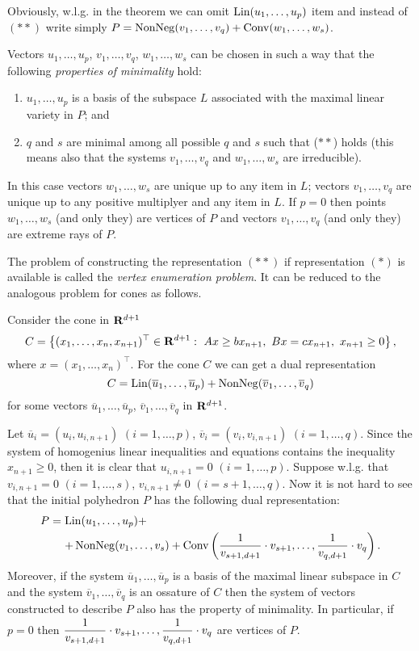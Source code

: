 \documentclass{article}
\newcommand{\RR}{{\rm\bf R}}
\newcommand{\Lin}{\mathop{\rm Lin}\nolimits}
\newcommand{\NonNeg}{\mathop{\rm NonNeg}\nolimits}
\newcommand{\Conv}{\mathop{\rm Conv}\nolimits}
\newcommand{\set}[1]{\left\{ #1\right\}}
\newcommand{\transpose}{^{\top}}
\newcommand{\fracc}[2]{\frac{\textstyle #1\strut}{\textstyle #2\strut}}
\newenvironment{narrowarray}[1]{\arraycolsep=0.15em\begin{array}{#1}}{\end{array}}
\begin{document}
Obviously, w.l.g. in the theorem 
we can omit $\Lin(u_1,\dots,u_p)$ item and instead of $(**)$ 
write simply $P=\NonNeg(v_1,\dots,v_q)+ \Conv(w_1,\dots,w_s)$.


Vectors $u_1,\dots,u_p$, $v_1,\dots,v_q$, $w_1,\dots,w_s$ 
can be chosen in such a way that 
the following {\em properties of minimality} hold:
\begin{enumerate}
  \item $u_1,\dots,u_p$ is a basis of the subspace $L$ associated with
        the maximal linear variety in $P$; and
  \item $q$ and $s$ are minimal among all possible $q$ and $s$ such that ($**$)
        holds (this means also that the systems $v_1,\dots,v_q$ and
        $w_1,\dots,w_s$ are irreducible).
\end{enumerate}
In this case 
vectors $w_1,\dots,w_s$ are unique up to any item in $L$;
vectors $v_1,\dots,v_q$ are unique up to any positive multiplyer and any item in $L$.
If $p=0$ then points $w_1,\dots,w_s$ (and only they) are vertices of $P$
          and vectors $v_1,\dots,v_q$ (and only they) are extreme rays of $P$.


The problem of constructing the representation $(**)$ if representation $(*)$  is available
is called
the {\em vertex enumeration problem}. 
It can be reduced to the analogous problem for cones as follows.

Consider the cone in $\RR^{d+1}$
$$
C = \set{(x_1,\dots,x_n,x_{n+1})\transpose \in \RR^{d+1}:
~ Ax\ge bx_{n+1}, 
~ Bx=cx_{n+1},
~x_{n+1} \ge 0},
$$
where $x=(x_1,\dots,x_n)\transpose$.
For the cone $C$ we can get a dual representation
$$
C=\Lin(\overline{u}_1,\dots,\overline{u}_p) + \NonNeg(\overline{v}_1,\dots,\overline{v}_q)
$$
for some vectors 
$\overline{u}_1,\dots,\overline{u}_p$, 
$\overline{v}_1,\dots,\overline{v}_q$ in $\RR^{d+1}$.

Let 
$\overline{u}_i=(u_i,u_{i,n+1})$ $(i=1,\dots,p)$, 
$\overline{v}_i=(v_i,v_{i,n+1})$ $(i=1,\dots,q)$.
Since the system of homogenius linear inequalities and equations contains the inequality
$x_{n+1} \ge 0$, then it is clear that $u_{i,n+1} = 0$ $(i=1,\dots,p)$.
Suppose w.l.g. that 
$v_{i,n+1} = 0$ $(i=1,\dots,s)$, $v_{i,n+1} \ne 0$ $(i=s+1,\dots,q)$.
Now it is not hard to see that the initial polyhedron $P$ has the following dual representation:
$$
\begin{narrowarray}{ccl}
P & = & \Lin(u_1,\dots,u_p) +   \\[.3em]
  &   &  + \NonNeg(v_1,\dots,v_s) + 
           \Conv\left(\fracc{1}{v_{s+1,d+1}}\cdot v_{s+1},\dots,\fracc{1}{v_{q,d+1}}\cdot v_q\right).
\end{narrowarray}
$$
Moreover, if the system $\overline{u}_1,\dots,\overline{u}_p$ 
is a basis of the maximal linear subspace in $C$ and
the system $\overline{v}_1,\dots,\overline{v}_q$ is an ossature of $C$ then
the system of vectors constructed to describe $P$ also has the property of
minimality. In particular, if $p=0$ then 
$\fracc{1}{v_{s+1,d+1}}\cdot v_{s+1},\dots,\fracc{1}{v_{q,d+1}}\cdot v_q$
are vertices of $P$.
\end{document}
